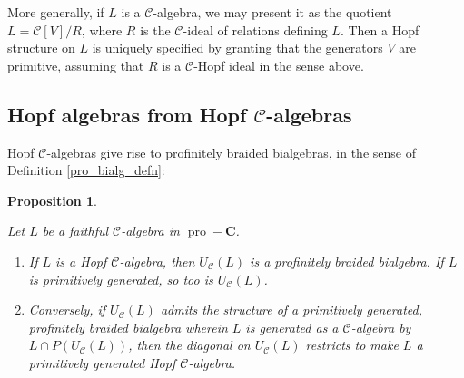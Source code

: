 \documentclass[12pt]{article}
\DeclareMathOperator{\pro}{pro}
\newcommand{\CC} {\mathcal{C}}
\newcommand{\bC} {\mathbf{C}}
\newcommand{\proC}{\pro\!-\bC}
\theoremstyle{plain}
\newtheorem{prop}[thm]{Proposition}
\theoremstyle{definition}
\theoremstyle{remark}
\begin{document}
More generally, if $L$ is a $\CC$-algebra, we may present it as the quotient $L = \CC[V] / R$, where $R$ is the $\CC$-ideal of relations defining $L$.  Then a Hopf structure on $L$ is uniquely specified by granting that the generators $V$ are primitive, assuming that $R$ is a $\CC$-Hopf ideal in the sense above.



\subsection{Hopf algebras from Hopf $\CC$-algebras} \label{pro_const_Hopf_sec}

Hopf $\CC$-algebras give rise to profinitely braided bialgebras, in the sense of Definition \ref{pro_bialg_defn}:

\begin{prop} \label{C_to_Hopf_prop}

Let $L$  be a faithful $\CC$-algebra in $\proC$.

\begin{enumerate}

\item If $L$ is a Hopf $\CC$-algebra, then $U_{\CC}(L)$ is a profinitely braided bialgebra.  If $L$ is primitively generated, so too is $U_{\CC}(L)$.

\item Conversely, if $U_{\CC}(L)$ admits the structure of a primitively generated, profinitely braided bialgebra wherein $L$ is generated as a $\CC$-algebra by $L \cap P(U_{\CC}(L))$, then the diagonal on $U_{\CC}(L)$ restricts to make $L$ a primitively generated Hopf $\CC$-algebra.

\end{enumerate}

\end{prop}
\end{document}
